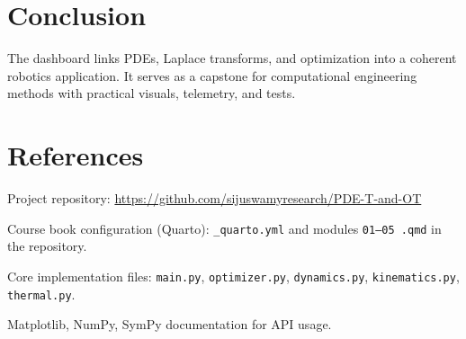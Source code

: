 \documentclass[12pt,a4paper]{report}
\begin{document}
\chapter{Conclusion}
The dashboard links PDEs, Laplace transforms, and optimization into a coherent robotics application. It serves as a capstone for computational engineering methods with practical visuals, telemetry, and tests.

\chapter{References}
\begin{enumerate}[label={[R\arabic*]},leftmargin=*,itemsep=0.25em]
  \item Project repository: \url{https://github.com/sijuswamyresearch/PDE-T-and-OT}
  \item Course book configuration (Quarto): \texttt{\_quarto.yml} and modules \texttt{01--05 .qmd} in the repository.
  \item Core implementation files: \texttt{main.py}, \texttt{optimizer.py}, \texttt{dynamics.py}, \texttt{kinematics.py}, \texttt{thermal.py}.
  \item Matplotlib, NumPy, SymPy documentation for API usage.
\end{enumerate}
\end{document}
